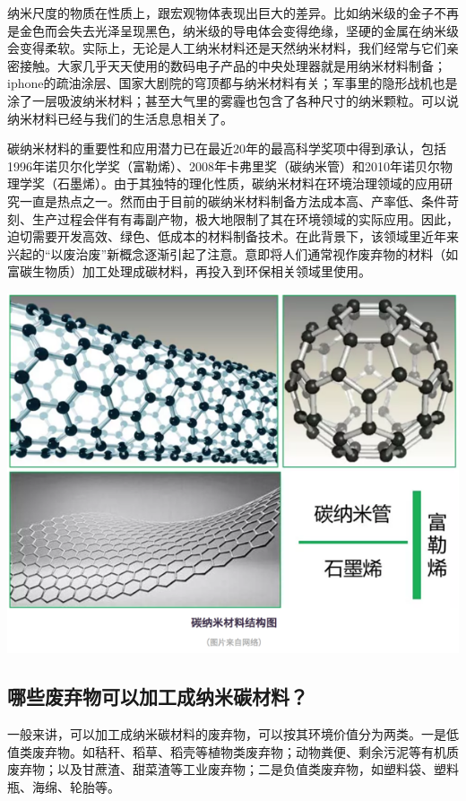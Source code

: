 \documentclass[]{book}
\begin{document}
纳米尺度的物质在性质上，跟宏观物体表现出巨大的差异。比如纳米级的金子不再是金色而会失去光泽呈现黑色，纳米级的导电体会变得绝缘，坚硬的金属在纳米级会变得柔软。实际上，无论是人工纳米材料还是天然纳米材料，我们经常与它们亲密接触。大家几乎天天使用的数码电子产品的中央处理器就是用纳米材料制备；iphone的疏油涂层、国家大剧院的穹顶都与纳米材料有关；军事里的隐形战机也是涂了一层吸波纳米材料；甚至大气里的雾霾也包含了各种尺寸的纳米颗粒。可以说纳米材料已经与我们的生活息息相关了。

碳纳米材料的重要性和应用潜力已在最近20年的最高科学奖项中得到承认，包括1996年诺贝尔化学奖（富勒烯）、2008年卡弗里奖（碳纳米管）和2010年诺贝尔物理学奖（石墨烯）。由于其独特的理化性质，碳纳米材料在环境治理领域的应用研究一直是热点之一。然而由于目前的碳纳米材料制备方法成本高、产率低、条件苛刻、生产过程会伴有有毒副产物，极大地限制了其在环境领域的实际应用。因此，迫切需要开发高效、绿色、低成本的材料制备技术。在此背景下，该领域里近年来兴起的``以废治废''新概念逐渐引起了注意。意即将人们通常视作废弃物的材料（如富碳生物质）加工处理成碳材料，再投入到环保相关领域里使用。

\includegraphics[width=8.33in]{images/nano1}

\subsection{哪些废弃物可以加工成纳米碳材料？}

一般来讲，可以加工成纳米碳材料的废弃物，可以按其环境价值分为两类。一是低值类废弃物。如秸秆、稻草、稻壳等植物类废弃物；动物粪便、剩余污泥等有机质废弃物；以及甘蔗渣、甜菜渣等工业废弃物；二是负值类废弃物，如塑料袋、塑料瓶、海绵、轮胎等。
\end{document}
